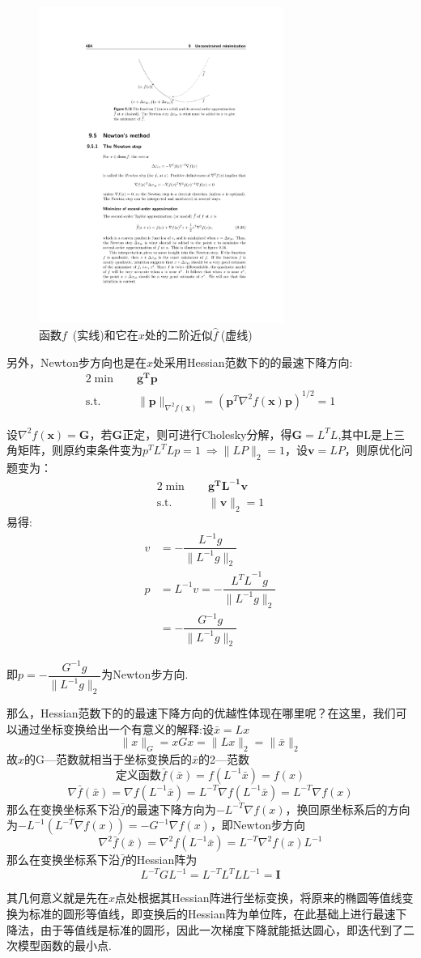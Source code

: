 \begin{figure}[H]
\centering
\includegraphics[width=8cm]{fig/4_5.pdf}
\caption{函数$f$\ (实线)和它在$x$处的二阶近似$\hat{f}\ $(虚线)}
\end{figure}

另外，Newton步方向也是在$x$处采用Hessian范数下的的最速下降方向:
\begin{alignat}{2}
\min \quad &\bm{g^Tp} \nonumber\\
\mbox{s.t.}\quad
&\|\bm{p}\|_{\nabla^2f(\bm{x})}=(\bm{p}^T\nabla^2f(\bm{x})\bm{p})^{1/2}=1\nonumber
\end{alignat}

设$\nabla^2f(\bm{x})=\bm{G}$，若$\bm{G}$正定，则可进行Cholesky分解，得$\bm{G}=L^TL$,其中L是上三角矩阵，则原约束条件变为$p^TL^TLp=1\ \Rightarrow \|LP\|_2=1$，设$\bm{v}=LP$，则原优化问题变为：
\begin{alignat}{2}
\min \quad &\bm{g^TL^{-1}v} \nonumber\\
\mbox{s.t.}\quad
&\|\bm{v}\|_2=1\nonumber
\end{alignat}
易得:
\begin{align}
v&=-\dfrac{L^{-1}g}{\|L^{-1}g\|_2}\nonumber\\
p&=L^{-1}v=-\dfrac{{L^TL}^{-1}g}{\|L^{-1}g\|_2}\nonumber\\
&=-\dfrac{G^{-1}g}{\|L^{-1}g\|_2}\nonumber
\end{align}

即$p=-\dfrac{G^{-1}g}{\|L^{-1}g\|_2}$为Newton步方向.

那么，Hessian范数下的的最速下降方向的优越性体现在哪里呢？在这里，我们可以通过坐标变换给出一个有意义的解释:设$\bar{x}=Lx$
\[\|x\|_G=xGx=\|Lx\|_2=\|\bar{x}\|_2\]
故$x$的G—范数就相当于坐标变换后的$\bar{x}$的2—范数
\[\text{定义函数}\bar{f}(\bar{x})=f(L^{-1}\bar{x})=f(x)\]
\[\nabla \bar{f}(\bar{x})=\nabla f(L^{-1}\bar{x})=L^{-T}\nabla f(L^{-1}\bar{x})=L^{-T}\nabla f(x)\]
那么在变换坐标系下沿$\bar{f}$的最速下降方向为$-L^{-T}\nabla f(x)$，换回原坐标系后的方向为$-L^{-1}(L^{-T}\nabla f(x))=-G^{-1}\nabla f(x)$，即Newton步方向
\[\nabla^2 \bar{f}(\bar{x})=\nabla^2 
f(L^{-1}\bar{x})=L^{-T}\nabla^2f(x)L^{-1}\]
那么在变换坐标系下沿$\bar{f}$的Hessian阵为\[L^{-T}GL^{-1}=L^{-T}L^TLL^{-1}=\bm{I}\]

其几何意义就是先在$x$点处根据其Hessian阵进行坐标变换，将原来的椭圆等值线变换为标准的圆形等值线，即变换后的Hessian阵为单位阵，在此基础上进行最速下降法，由于等值线是标准的圆形，因此一次梯度下降就能抵达圆心，即迭代到了二次模型函数的最小点.